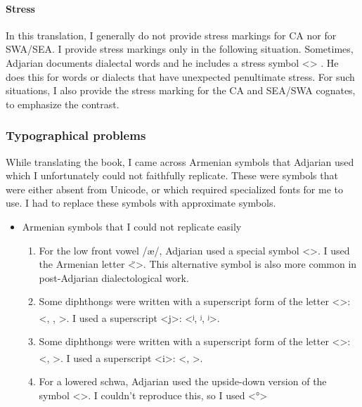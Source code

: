 \paragraph{Stress}
In this translation, I generally do not provide stress markings for CA nor for SWA/SEA. I provide stress markings only in the following situation. Sometimes, Adjarian documents dialectal words and he includes a stress symbol <> . He does this for words or dialects that have unexpected penultimate stress. For such situations, I also provide the stress marking for the CA and SEA/SWA cognates, to emphasize the contrast. 

\subsubsection{Typographical problems}\label{sec:HossepIntro:phonotransc:adj:typograph}

While translating the book, I came across Armenian symbols that Adjarian used which I unfortunately could not faithfully replicate. These were symbols that were either absent from Unicode, or which required specialized fonts for me to use. I had to replace these symbols with approximate symbols. 

\begin{itemize}
	\item Armenian symbols that I could not replicate easily 
	\begin{enumerate}
\item For the low front vowel /æ/, Adjarian used a special symbol 
<>. I used the  Armenian letter <̈>. This alternative symbol is also more common in post-Adjarian dialectological work. 
\item Some diphthongs were written with a superscript form of the letter <>: <\textsuperscript{}, \textsuperscript{},   \textsuperscript{}>. I used a superscript <j>: 	<ʲ, ʲ, ʲ>. 
\item Some diphthongs were written with a superscript form of the letter <>: <\textsuperscript{}, \textsuperscript{}>. I used a superscript <i>: 	<, >. 
\item For a lowered schwa, Adjarian used the  upside-down version of the symbol <>. I couldn't reproduce this, so I used  <°> 
	\end{enumerate}
\end{itemize}
 
